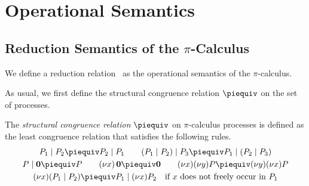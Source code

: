 \section{Operational Semantics} \label{sec:operational_semantics}
\subsection{Reduction Semantics of the \( \pi \)-Calculus}
We define a reduction relation~\cite{milner1993polyadic} as the operational semantics of the $\pi$-calculus.

As usual, we first define the structural congruence relation \( \piequiv \) on the set of processes.
\begin{definition}
  The \emph{structural congruence relation} $\piequiv$ on %
  $\pi$-calculus processes is defined as the least congruence relation that satisfies the following %
  rules.
    \begin{gather*}
        P_1 \mid P_2 \piequiv P_2 \mid P_1
        \qquad (P_1 \mid P_2) \mid P_3 \piequiv P_1 \mid (P_2 \mid P_3) 
        \\     P \mid \textbf{0} \piequiv P 
        \qquad (\nu x)\,\textbf{0} \piequiv \textbf{0}
        \qquad (\nu x)(\nu y)P \piequiv (\nu y)(\nu x)P
        \\     (\nu x)(P_1 \mid P_2) \piequiv P_1 \mid (\nu x)P_2 \quad \text{if $x$ does not freely occur in $P_1$}
    \end{gather*}
\end{definition}

